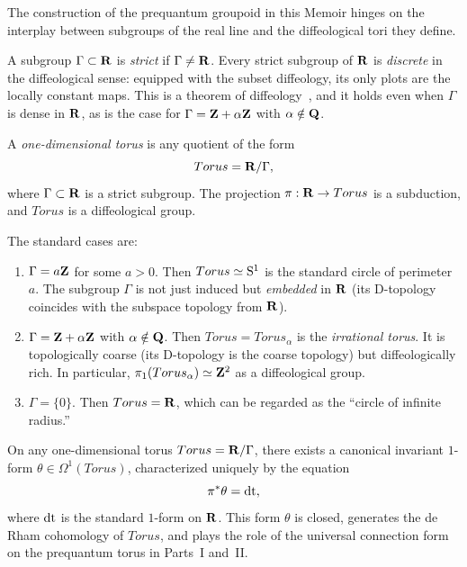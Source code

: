   \begin{article}
    \label{art:One-Dimensional Tori}
    The construction of the prequantum groupoid in this Memoir hinges on the
    interplay between subgroups of the real line and the diffeological tori
    they define.
    
    A subgroup $\Gamma \subset {\mathbf{R}}$ is \emph{strict} if $\Gamma \neq {\mathbf{R}}$.
    Every strict subgroup of ${\mathbf{R}}$ is \emph{discrete} in the diffeological sense:
    equipped with the subset diffeology,
    its only plots are the locally constant maps.
    This is a theorem of diffeology~\cite{PIZ13},
    and it holds even when $\Gamma$ is dense in ${\mathbf{R}}$,
    as is the case for $\Gamma = {\mathbf{Z}} + \alpha{\mathbf{Z}}$ with $\alpha \notin {\mathbf{Q}}$.
    
    \begin{definition}
      A \emph{one-dimensional torus} is any quotient of the form
      \[
        Torus = {\mathbf{R}}/\Gamma,
        \]
      where $\Gamma \subset {\mathbf{R}}$ is a strict subgroup.
      The projection $\pi: {\mathbf{R}} \to Torus$ is a subduction,
      and $Torus$ is a diffeological group.
    \end{definition}
    
    The standard cases are:
    \begin{enumerate}
      \item $\Gamma = a{\mathbf{Z}}$ for some $a > 0$.
      Then $Torus \simeq \mathrm{S}^1$ is the standard circle of perimeter $a$.
      The subgroup $\Gamma$ is not just induced but \emph{embedded} in ${\mathbf{R}}$
      (its D-topology coincides with the subspace topology from ${\mathbf{R}}$).
      \item $\Gamma = {\mathbf{Z}} + \alpha{\mathbf{Z}}$ with $\alpha \notin {\mathbf{Q}}$.
      Then $Torus = Torus_\alpha$ is the \emph{irrational torus}.
      It is topologically coarse (its D-topology is the coarse topology)
      but diffeologically rich.
      In particular,
      $\pi_1(Torus_\alpha) \simeq {\mathbf{Z}}^2$ as a diffeological group.
      \item $\Gamma = \{0\}$.
      Then $Torus = {\mathbf{R}}$,
      which can be regarded as the ``circle of infinite radius.''
    \end{enumerate}
    
    On any one-dimensional torus $Torus = {\mathbf{R}}/\Gamma$,
    there exists a canonical invariant $1$-form $\theta \in \Omega^1(Torus)$,
    characterized uniquely by the equation
    \[
      \pi^*\theta = \mathrm{dt},
      \]
    where $\mathrm{dt}$ is the standard $1$-form on ${\mathbf{R}}$.
    This form $\theta$ is closed,
    generates the de Rham cohomology of $Torus$,
    and plays the role of the universal connection form
    on the prequantum torus in Parts~I and~II.
  \end{article}
  
